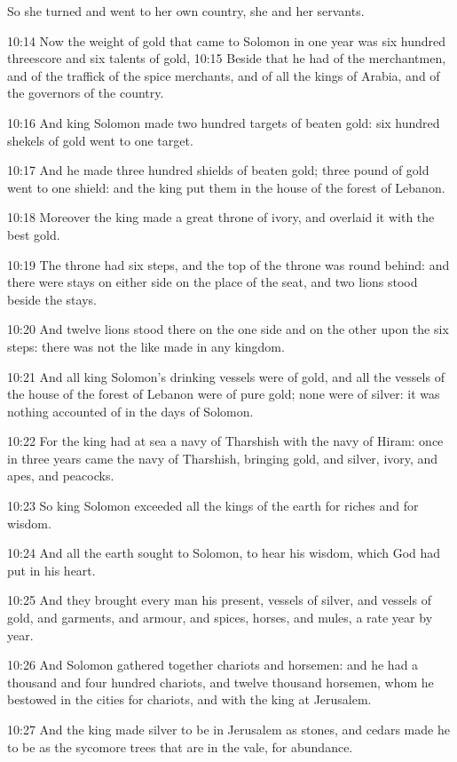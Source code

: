 So she turned and went to her own country, she and her servants.

10:14 Now the weight of gold that came to Solomon in one year was six hundred threescore and six talents of gold, 10:15 Beside that he had of the merchantmen, and of the traffick of the spice merchants, and of all the kings of Arabia, and of the governors of the country.

10:16 And king Solomon made two hundred targets of beaten gold: six hundred shekels of gold went to one target.

10:17 And he made three hundred shields of beaten gold; three pound of gold went to one shield: and the king put them in the house of the forest of Lebanon.

10:18 Moreover the king made a great throne of ivory, and overlaid it with the best gold.

10:19 The throne had six steps, and the top of the throne was round behind: and there were stays on either side on the place of the seat, and two lions stood beside the stays.

10:20 And twelve lions stood there on the one side and on the other upon the six steps: there was not the like made in any kingdom.

10:21 And all king Solomon's drinking vessels were of gold, and all the vessels of the house of the forest of Lebanon were of pure gold; none were of silver: it was nothing accounted of in the days of Solomon.

10:22 For the king had at sea a navy of Tharshish with the navy of Hiram: once in three years came the navy of Tharshish, bringing gold, and silver, ivory, and apes, and peacocks.

10:23 So king Solomon exceeded all the kings of the earth for riches and for wisdom.

10:24 And all the earth sought to Solomon, to hear his wisdom, which God had put in his heart.

10:25 And they brought every man his present, vessels of silver, and vessels of gold, and garments, and armour, and spices, horses, and mules, a rate year by year.

10:26 And Solomon gathered together chariots and horsemen: and he had a thousand and four hundred chariots, and twelve thousand horsemen, whom he bestowed in the cities for chariots, and with the king at Jerusalem.

10:27 And the king made silver to be in Jerusalem as stones, and cedars made he to be as the sycomore trees that are in the vale, for abundance.

